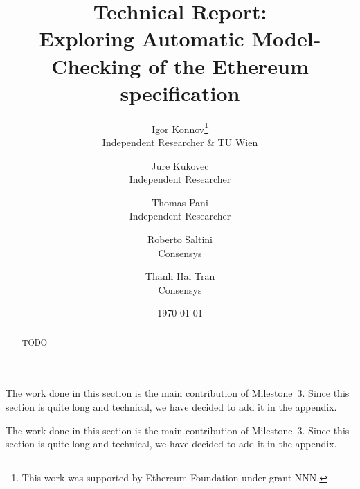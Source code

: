 \documentclass[12pt]{article}
\title{Technical Report:\\
       Exploring Automatic Model-Checking of the Ethereum specification}
\author{
    Igor Konnov\thanks{This work was supported by Ethereum Foundation
    under grant NNN.}\\ \small Independent Researcher \& TU Wien \\
    \and
    Jure Kukovec\footnotemark[1] \\ \small Independent Researcher \\
    \and
    Thomas Pani\footnotemark[1] \\ \small Independent Researcher\\
    \and
    Roberto Saltini \\ \small Consensys \\
    \and
    Thanh Hai Tran \\ \small Consensys
}
\date{\today}
\begin{document}
\maketitle

\begin{abstract}
    TODO
\end{abstract}

















\pagebreak

\appendix

The work done in this section is the main contribution of Milestone~3.  Since
this section is quite long and technical, we have decided to add it in the
appendix.




\pagebreak

\appendix

The work done in this section is the main contribution of Milestone~3.  Since
this section is quite long and technical, we have decided to add it in the
appendix.




\end{document}
